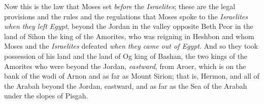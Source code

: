 \begin{biblechapter}
\verse Now this is the law that Moses set \textit{before} the \textit{Israelites};
\verse these are the legal provisions and the rules and the regulations that Moses spoke to the \textit{Israelites} \textit{when they left Egypt},
\verse beyond the Jordan in the valley opposite Beth Peor in the land of Sihon the king of the Amorites, who was reigning in Heshbon and whom Moses and the \textit{Israelites} defeated \textit{when they came out of Egypt}.
\verse And so they took possession of his land and the land of Og king of Bashan, the two kings of the Amorites who were beyond the Jordan, \textit{eastward},
\verse from Aroer, which is on the bank of the wadi of Arnon and as far as Mount Sirion; that is, Hermon,
\verse and all of the Arabah beyond the Jordan, eastward, and as far as the Sea of the Arabah under the slopes of Pisgah.
\end{biblechapter}


